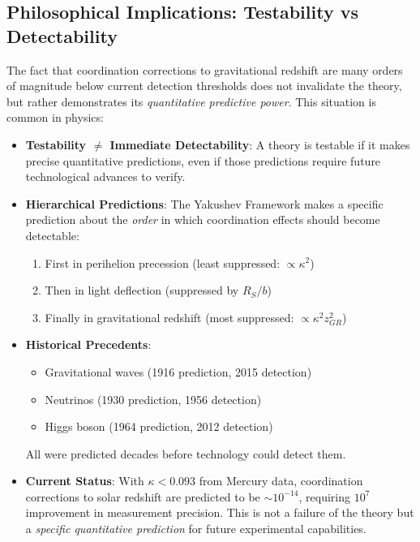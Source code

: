 \documentclass[11pt,a4paper]{article}
\begin{document}
	\subsection{Philosophical Implications: Testability vs Detectability}
	\label{subsec:philosophy-testability}
	
	The fact that coordination corrections to gravitational redshift are many orders of magnitude below current detection thresholds does not invalidate the theory, but rather demonstrates its \emph{quantitative predictive power}. This situation is common in physics:
	
	\begin{itemize}
		\item \textbf{Testability $\neq$ Immediate Detectability}: A theory is testable if it makes precise quantitative predictions, even if those predictions require future technological advances to verify.
		
		\item \textbf{Hierarchical Predictions}: The Yakushev Framework makes a specific prediction about the \emph{order} in which coordination effects should become detectable:
		\begin{enumerate}
			\item First in perihelion precession (least suppressed: $\propto \kappa^2$)
			\item Then in light deflection (suppressed by $R_S/b$)
			\item Finally in gravitational redshift (most suppressed: $\propto \kappa^2 z_{GR}^2$)
		\end{enumerate}
		
		\item \textbf{Historical Precedents}:
		\begin{itemize}
			\item Gravitational waves (1916 prediction, 2015 detection)
			\item Neutrinos (1930 prediction, 1956 detection)
			\item Higgs boson (1964 prediction, 2012 detection)
		\end{itemize}
		All were predicted decades before technology could detect them.
		
		\item \textbf{Current Status}: With $\kappa < 0.093$ from Mercury data, coordination corrections to solar redshift are predicted to be $\sim 10^{-14}$, requiring $10^7$ improvement in measurement precision. This is not a failure of the theory but a \emph{specific quantitative prediction} for future experimental capabilities.
	\end{itemize}
	
\end{document}
